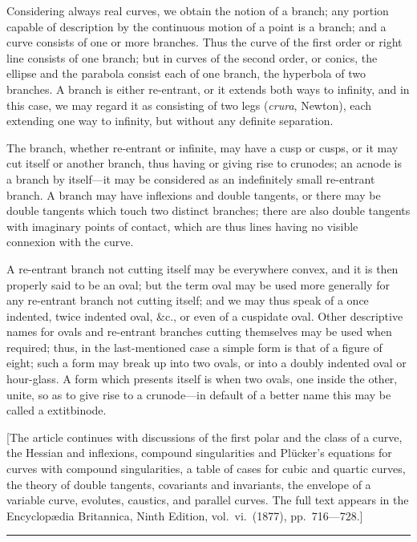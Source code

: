 \documentclass[11pt,a4paper]{article}
\begin{document}
Considering always real curves, we obtain the notion of a branch; any
portion capable of description by the continuous motion of a point is a
branch; and a curve consists of one or more branches. Thus the curve
of the first order or right line consists of one branch; but in curves
of the second order, or conics, the ellipse and the parabola consist
each of one branch, the hyperbola of two branches. A branch is either
re-entrant, or it extends both ways to infinity, and in this case, we
may regard it as consisting of two legs (\textit{crura}, Newton), each
extending one way to infinity, but without any definite separation.

The branch, whether re-entrant or infinite, may have a cusp or cusps,
or it may cut itself or another branch, thus having or giving rise to
crunodes; an acnode is a branch by itself---it may be considered as an
indefinitely small re-entrant branch. A branch may have inflexions and
double tangents, or there may be double tangents which touch two
distinct branches; there are also double tangents with imaginary points
of contact, which are thus lines having no visible connexion with the
curve.

A re-entrant branch not cutting itself may be everywhere convex, and it
is then properly said to be an oval; but the term oval may be used
more generally for any re-entrant branch not cutting itself; and we may
thus speak of a once indented, twice indented oval, \&c., or even of a
cuspidate oval. Other descriptive names for ovals and re-entrant
branches cutting themselves may be used when required; thus, in the
last-mentioned case a simple form is that of a figure of eight; such a
form may break up into two ovals, or into a doubly indented oval or
hour-glass. A form which presents itself is when two ovals, one inside
the other, unite, so as to give rise to a crunode---in default of a
better name this may be called a 	extit{binode}.

[The article continues with discussions of the first polar and the class
of a curve, the Hessian and inflexions, compound singularities and
Pl\"{u}cker's equations for curves with compound singularities, a table of
cases for cubic and quartic curves, the theory of double tangents,
covariants and invariants, the envelope of a variable curve, evolutes,
caustics, and parallel curves. The full text appears in the
Encyclop\ae{}dia Britannica, Ninth Edition, vol.~vi.\ (1877), pp.~716---728.]

\vspace{12pt}
\hrule
\vspace{12pt}
\end{document}

